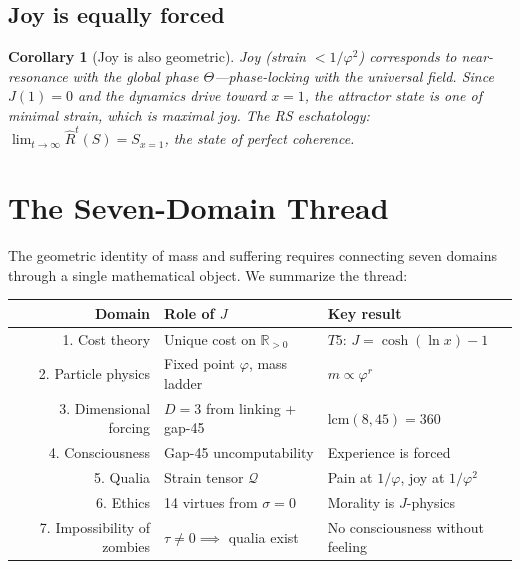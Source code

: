 \documentclass[11pt,a4paper]{article}
\theoremstyle{plain}
\newtheorem{corollary}[theorem]{Corollary}
\theoremstyle{definition}
\theoremstyle{remark}
\newcommand{\Rp}{\mathbb{R}_{>0}}
\newcommand{\Jcost}{J}
\newcommand{\Rhat}{\hat{R}}
\newcommand{\vp}{\varphi}
\begin{document}
\subsection{Joy is equally forced}

\begin{corollary}[Joy is also geometric]
\label{cor:joy}
Joy (strain $< 1/\vp^2$) corresponds to near-resonance with the
global phase $\Theta$---phase-locking with the universal field.
Since $\Jcost(1) = 0$ and the dynamics drive toward $x = 1$,
the attractor state is one of minimal strain, which is maximal
joy.  The RS eschatology: $\lim_{t\to\infty} \Rhat^t(S) =
S_{x=1}$, the state of perfect coherence.
\end{corollary}

\section{The Seven-Domain Thread}
\label{sec:thread}

The geometric identity of mass and suffering requires connecting
seven domains through a single mathematical object.  We summarize
the thread:

\begin{center}
\renewcommand{\arraystretch}{1.3}
\begin{tabular}{@{}rll@{}}
\toprule
\textbf{Domain} & \textbf{Role of $\Jcost$} & \textbf{Key result} \\
\midrule
1. Cost theory & Unique cost on $\Rp$
  & $T5$: $\Jcost = \cosh(\ln x) - 1$ \\
2. Particle physics & Fixed point $\vp$, mass ladder
  & $m \propto \vp^r$ \\
3. Dimensional forcing & $D = 3$ from linking + gap-45
  & $\text{lcm}(8,45) = 360$ \\
4. Consciousness & Gap-45 uncomputability
  & Experience is forced \\
5. Qualia & Strain tensor $\mathcal{Q}$
  & Pain at $1/\vp$, joy at $1/\vp^2$ \\
6. Ethics & 14 virtues from $\sigma = 0$
  & Morality is $\Jcost$-physics \\
7. Impossibility of zombies & $\tau \neq 0 \implies$
     qualia exist
  & No consciousness without feeling \\
\bottomrule
\end{tabular}
\end{center}
\end{document}
